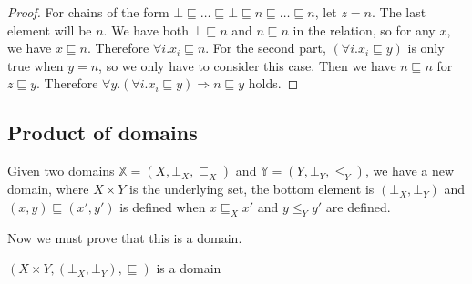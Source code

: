 \begin{proof}
For chains of the form $\bot \sqsubseteq \dots \sqsubseteq \bot \sqsubseteq n \sqsubseteq \dots \sqsubseteq n$, let $z = n$.  The last element will be $n$. We have both $\bot \sqsubseteq n$ and $n \sqsubseteq n$ in the relation, so for any $x$, we have $x \sqsubseteq n$. Therefore $\forall i . x_i \sqsubseteq n$. For the second part, $(\forall i . x_i \sqsubseteq y)$ is only true when $y = n$, so we only have to consider this case. Then we have $n \sqsubseteq n$ for $z \sqsubseteq y$. Therefore $\forall y. (\forall i . x_i \sqsubseteq y) \Rightarrow n \sqsubseteq y$ holds.
\end{proof}

\subsection{Product of domains}\label{prod}
Given two domains $\mathbb{X} = (X, \bot_X, \sqsubseteq_X)$ and $\mathbb{Y} = (Y, \bot_Y, \leq_Y)$, we have a new domain,  where $X \times Y$ is the underlying set, the bottom element is $(\bot_X, \bot_Y)$ and $(x,y) \sqsubseteq (x',y')$ is defined when $x \sqsubseteq_X x'$ and $y \leq_Y y'$ are defined.

\vspace{0.25cm}

Now we must prove that this is a domain.

\vspace{0.5cm}

\begin{lem}
$(X \times Y, (\bot_X, \bot_Y), \sqsubseteq)$ is a domain
\end{lem}


